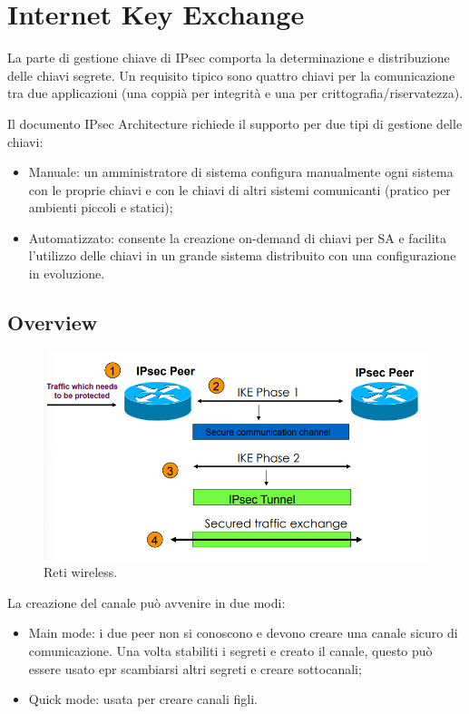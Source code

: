 \section{Internet Key Exchange}

La parte di gestione chiave di IPsec comporta la determinazione e distribuzione delle chiavi segrete. Un requisito tipico sono quattro chiavi per la comunicazione tra due applicazioni (una coppià per integrità e una per crittografia/riservatezza).

Il documento IPsec Architecture richiede il supporto per due tipi di gestione delle chiavi:
\begin{itemize}
    \item Manuale: un amministratore di sistema configura manualmente ogni sistema con le proprie chiavi e con le chiavi di altri sistemi comunicanti (pratico per ambienti piccoli e statici);
	\item Automatizzato: consente la creazione on-demand di chiavi per SA e facilita l'utilizzo delle chiavi in un grande sistema distribuito con una configurazione in evoluzione.
\end{itemize}

\subsection{Overview}

\begin{figure}[h]
    \centering
    \includegraphics[width=1\textwidth]{images/chapter9/9-12.png}
    \caption{Reti wireless.}
    \label{fig:9-12}
\end{figure}

La creazione del canale può avvenire in due modi:
\begin{itemize}
    \item Main mode: i due peer non si conoscono e devono creare una canale sicuro di comunicazione. Una volta stabiliti i segreti e creato il canale, questo può essere usato epr scambiarsi altri segreti e creare sottocanali;
	\item Quick mode: usata per creare canali figli. 
\end{itemize}

